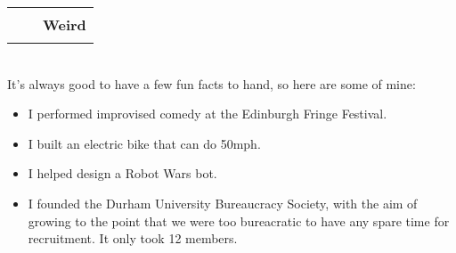 \documentclass[hidelinks, 12pt, a4paper]{article}
\begin{document}
	\begin{tabularx}{\textwidth}{@{}Xrr@{}}&
		\rule{50pt}{1pt}&
		\textbf{Weird}
	\end{tabularx}\\

	It's always good to have a few fun facts to hand, so here are some of mine:
	
	\begin{itemize}
		\item I performed improvised comedy at the Edinburgh Fringe Festival.
		
		\item I built an electric bike that can do 50mph.
		
		\item I helped design a Robot Wars bot.
		
		\item I founded the Durham University Bureaucracy Society, with the aim of growing to the point that we were too bureacratic to have any spare time for recruitment. It only took 12 members.
	\end{itemize}
\end{document}

